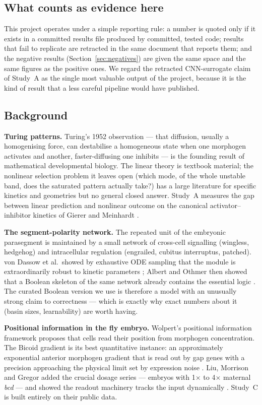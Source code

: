 \subsection{What counts as evidence here}

This project operates under a simple reporting rule: a number is quoted only
if it exists in a committed results file produced by committed, tested code;
results that fail to replicate are retracted in the same document that
reports them; and the negative results (Section~\ref{sec:negatives}) are
given the same space and the same figures as the positive ones. We regard the
retracted CNN-surrogate claim of Study~A as the single most valuable output
of the project, because it is the kind of result that a less careful pipeline
would have published.

\subsection{Background}

\textbf{Turing patterns.} Turing's 1952 observation \cite{turing1952} ---
that diffusion, usually a homogenising force, can destabilise a homogeneous
state when one morphogen activates and another, faster-diffusing one
inhibits --- is the founding result of mathematical developmental biology.
The linear theory is textbook material; the nonlinear selection problem it
leaves open (which mode, of the whole unstable band, does the saturated
pattern actually take?) has a large literature for specific kinetics and
geometries but no general closed answer. Study~A measures the gap between
linear prediction and nonlinear outcome on the canonical activator--inhibitor
kinetics of Gierer and Meinhardt \cite{gierer1972}.

\textbf{The segment-polarity network.} The repeated unit of the embryonic
parasegment is maintained by a small network of cross-cell signalling
(wingless, hedgehog) and intracellular regulation (engrailed, cubitus
interruptus, patched). von Dassow et al.\ showed by exhaustive ODE sampling
that the module is extraordinarily robust to kinetic parameters
\cite{vondassow2000}; Albert and Othmer then showed that a Boolean skeleton
of the same network already contains the essential logic \cite{albert2003}.
The curated Boolean version we use \cite{helikar2012} is therefore a model
with an unusually strong claim to correctness --- which is exactly why exact
numbers about it (basin sizes, learnability) are worth having.

\textbf{Positional information in the fly embryo.} Wolpert's positional
information framework \cite{wolpert1969} proposes that cells read their
position from morphogen concentration. The Bicoid gradient is its best
quantitative instance: an approximately exponential anterior morphogen
gradient \cite{gregor2007} that is read out by gap genes with a precision
approaching the physical limit set by expression noise
\cite{dubuis2013,petkova2019}. Liu, Morrison and Gregor added the crucial
dosage series --- embryos with 1$\times$ to 4$\times$ maternal \emph{bcd} ---
and showed the readout machinery tracks the input dynamically
\cite{liu2013}. Study~C is built entirely on their public data.

